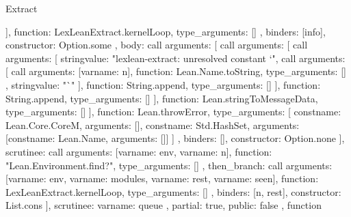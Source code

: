 \begin{lexlean}{Extract}
\begin{toolingmodule}
{{{{{{{{                      ],
                      function: LexLeanExtract.kernelLoop,
                      type_arguments: []
                    },
                    binders: [info],
                    constructor: Option.some
                  },
                  {
                    body: call{
                      arguments: [
                        call{
                          arguments: [
                            call{
                              arguments: [
                                string{value: "lexlean-extract: unresolved constant `"},
                                call{
                                  arguments: [
                                    call{
                                      arguments: [var{name: n}],
                                      function: Lean.Name.toString,
                                      type_arguments: []
                                    },
                                    string{value: "`"}
                                  ],
                                  function: String.append,
                                  type_arguments: []
                                }
                              ],
                              function: String.append,
                              type_arguments: []
                            }
                          ],
                          function: Lean.stringToMessageData,
                          type_arguments: []
                        }
                      ],
                      function: Lean.throwError,
                      type_arguments: [
                        const{name: Lean.Core.CoreM, arguments: []},
                        const{name: Std.HashSet, arguments: [const{name: Lean.Name, arguments: []}]}
                      ]
                    },
                    binders: [],
                    constructor: Option.none
                  }
                ],
                scrutinee: call{
                  arguments: [var{name: env}, var{name: n}],
                  function: "Lean.Environment.find?",
                  type_arguments: []
                }
              },
              then_branch: call{
                arguments: [var{name: env}, var{name: modules}, var{name: rest}, var{name: seen}],
                function: LexLeanExtract.kernelLoop,
                type_arguments: []
              }
            },
            binders: [n, rest],
            constructor: List.cons
          }
        ],
        scrutinee: var{name: queue}
      },
      partial: true,
      public: false
    },
    function{
}}
\end{toolingmodule}
\end{lexlean}
